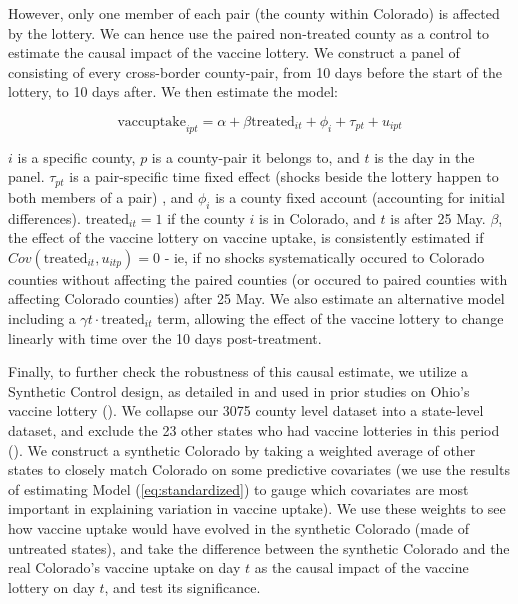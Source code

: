 \documentclass[12pt]{article}
\begin{document}
\begin{spacing}{1.5}
		However, only one member of each pair (the county within Colorado) is affected by the lottery. We can hence use the paired non-treated county as a control to estimate the causal impact of the vaccine lottery. We construct a panel of consisting of every cross-border county-pair, from 10 days before the start of the lottery, to 10 days after. We then estimate the model:
		
		\begin{equation} \label{eq:pairdesign}
			\textrm{vaccuptake}_{ipt} = \alpha + \beta \textrm{treated}_{it} + \phi_i + \tau_{pt} + u_{ipt}
		\end{equation}
		
		$i$ is a specific county, $p$ is a county-pair it belongs to, and $t$ is the day in the panel. $\tau_{pt}$ is a pair-specific time fixed effect (shocks beside the lottery happen to both members of a pair) , and $\phi_i$ is a county fixed account (accounting for initial differences). $\textrm{treated}_{it}=1$ if the county $i$ is in Colorado, and $t$ is after 25 May. $\beta$, the effect of the vaccine lottery on vaccine uptake, is consistently estimated if $Cov(\textrm{treated}_{it}, u_{itp})=0$ - ie, if no shocks systematically occured to Colorado counties without affecting the paired counties (or occured to paired counties with affecting Colorado counties) after 25 May. We also estimate an alternative model including a $\gamma t\cdot\textrm{treated}_{it}$ term, allowing the effect of the vaccine lottery to change linearly with time over the 10 days post-treatment.
		
		Finally, to further check the robustness of this causal estimate, we utilize a Synthetic Control design, as detailed in \citet{abadie_using_2021} and used in prior studies on Ohio's vaccine lottery (\cite{lang_did_2022}). We collapse our 3075 county level dataset into a state-level dataset, and exclude the 23 other states who had vaccine lotteries in this period (\cite{thirumurthy_association_2022}). We construct a synthetic Colorado by taking a weighted average of other states to closely match Colorado on some predictive covariates (we use the results of estimating Model (\ref{eq:standardized}) to gauge which covariates are most important in explaining variation in vaccine uptake). We use these weights to see how vaccine uptake would have evolved in the synthetic Colorado (made of untreated states), and take the difference between the synthetic Colorado and the real Colorado's vaccine uptake on day $t$ as the causal impact of the vaccine lottery on day $t$, and test its significance.
		

\end{spacing}
\end{document}
